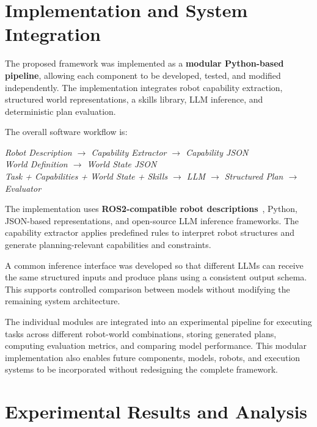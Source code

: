 \documentclass[12pt,a4paper]{article}
\begin{document}
\section{Implementation and System Integration}

The proposed framework was implemented as a \textbf{modular Python-based pipeline}, allowing each component to be developed, tested, and modified independently.
The implementation integrates robot capability extraction, structured world representations, a skills library, LLM inference, and deterministic plan evaluation.

The overall software workflow is:

\begin{center}
\begin{singlespace}
\textit{Robot Description $\rightarrow$ Capability Extractor $\rightarrow$ Capability JSON}\\[4pt]
\textit{World Definition $\rightarrow$ World State JSON}\\[4pt]
\textit{Task + Capabilities + World State + Skills $\rightarrow$ LLM $\rightarrow$ Structured Plan $\rightarrow$ Evaluator}
\end{singlespace}
\end{center}

The implementation uses \textbf{ROS2-compatible robot descriptions}~\cite{ros2}, Python, JSON-based representations, and open-source LLM inference frameworks.
The capability extractor applies predefined rules to interpret robot structures and generate planning-relevant capabilities and constraints.

A common inference interface was developed so that different LLMs can receive the same structured inputs and produce plans using a consistent output schema.
This supports controlled comparison between models without modifying the remaining system architecture.

The individual modules are integrated into an experimental pipeline for executing tasks across different robot-world combinations, storing generated plans, computing evaluation metrics, and comparing model performance.
This modular implementation also enables future components, models, robots, and execution systems to be incorporated without redesigning the complete framework.

\section{Experimental Results and Analysis}
\end{document}
